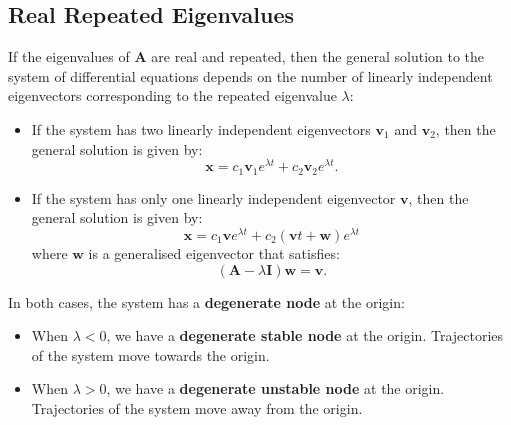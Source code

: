\documentclass{article}
\begin{document}
\subsection{Real Repeated Eigenvalues}
If the eigenvalues of \(\symbf{A}\) are real and repeated, then the
general solution to the system of differential equations depends on the
number of linearly independent eigenvectors corresponding to the
repeated eigenvalue \(\lambda\):
\begin{itemize}
    \item If the system has two linearly independent eigenvectors
          \(\symbf{v}_1\) and \(\symbf{v}_2\), then the general
          solution is given by:
          \begin{equation*}
              \symbf{x} = c_1 \symbf{v}_1 e^{\lambda t} + c_2 \symbf{v}_2 e^{\lambda t}.
          \end{equation*}
    \item If the system has only one linearly independent eigenvector
          \(\symbf{v}\), then the general solution is given by:
          \begin{equation*}
              \symbf{x} = c_1 \symbf{v} e^{\lambda t} + c_2 \left( \symbf{v} t + \symbf{w}  \right) e^{\lambda t}
          \end{equation*}
          where \(\symbf{w}\) is a generalised eigenvector that
          satisfies:
          \begin{equation*}
              \left( \symbf{A} - \lambda \symbf{I} \right) \symbf{w} = \symbf{v}.
          \end{equation*}
\end{itemize}
In both cases, the system has a \textbf{degenerate node} at the origin:
\begin{itemize}
    \item When \(\lambda < 0\), we have a \textbf{degenerate stable
          node} at the origin. Trajectories of the system move towards
          the origin.
    \item When \(\lambda > 0\), we have a \textbf{degenerate unstable
          node} at the origin. Trajectories of the system move away
          from the origin.
\end{itemize}
\end{document}
